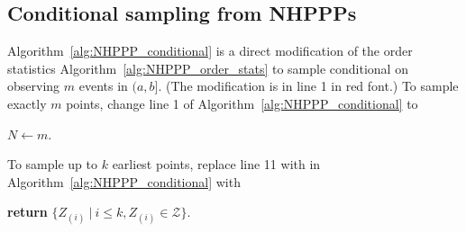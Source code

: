 \documentclass[article,nojss]{jss}\usepackage[]{graphicx}\usepackage[]{xcolor}
\begin{document}
\begin{appendix}


\newpage
\section{Conditional sampling from NHPPPs} \label{app:conditional_sampling}
Algorithm~\ref{alg:NHPPP_conditional} is a direct modification of the order statistics Algorithm~\ref{alg:NHPPP_order_stats} to sample conditional on observing $m$ events in $(a,b]$. (The modification is in line 1 in red font.)
To sample exactly $m$ points, change line 1 of Algorithm~\ref{alg:NHPPP_conditional} to
\begin{center}
$N \gets m$.
\end{center}
To sample up to $k$ earliest points, replace line 11 with in Algorithm~\ref{alg:NHPPP_conditional} with
\begin{center}
\textbf{return} {$\{Z_{(i)} \ | \ i \le k, Z_{(i)} \in \mathcal{Z}\}$}.
\end{center}









\end{appendix}
\newpage
\end{document}

